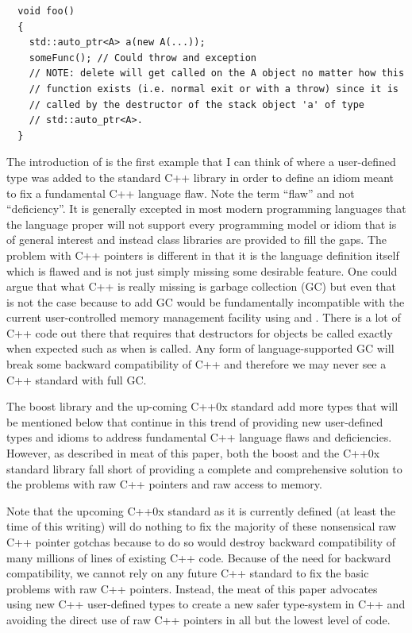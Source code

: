 \documentclass[pdf,ps2pdf,11pt]{SANDreport}
\begin{document}
{\small\begin{verbatim}
  void foo()
  {
    std::auto_ptr<A> a(new A(...));
    someFunc(); // Could throw and exception
    // NOTE: delete will get called on the A object no matter how this
    // function exists (i.e. normal exit or with a throw) since it is
    // called by the destructor of the stack object 'a' of type
    // std::auto_ptr<A>. 
  }
\end{verbatim}}

The introduction of {} is the first example that I
can think of where a user-defined type was added to the standard C++
library in order to define an idiom meant to fix a fundamental C++
language flaw.  Note the term ``flaw'' and not ``deficiency''.  It is
generally excepted in most modern programming languages that the
language proper will not support every programming model or idiom that
is of general interest and instead class libraries are provided to
fill the gaps.  The problem with C++ pointers is different in that it
is the language definition itself which is flawed and is not just
simply missing some desirable feature.  One could argue that what C++
is really missing is garbage collection (GC) but even that is not the
case because to add GC would be fundamentally incompatible with the
current user-controlled memory management facility using {}
and {}.  There is a lot of C++ code out there that
requires that destructors for objects be called exactly when expected
such as when {} is called.  Any form of language-supported
GC will break some backward compatibility of C++ and therefore we may
never see a C++ standard with full GC.

The boost library and the up-coming C++0x standard add more types that
will be mentioned below that continue in this trend of providing new
user-defined types and idioms to address fundamental C++ language
flaws and deficiencies.  However, as described in meat of this paper,
both the boost and the C++0x standard library fall short of providing
a complete and comprehensive solution to the problems with raw C++
pointers and raw access to memory.

Note that the upcoming C++0x standard as it is currently defined (at
least the time of this writing) will do nothing to fix the majority of
these nonsensical raw C++ pointer gotchas because to do so would
destroy backward compatibility of many millions of lines of existing
C++ code.  Because of the need for backward compatibility, we cannot
rely on any future C++ standard to fix the basic problems with raw C++
pointers.  Instead, the meat of this paper advocates using new C++
user-defined types to create a new safer type-system in C++ and
avoiding the direct use of raw C++ pointers in all but the lowest
level of code.
\end{document}

